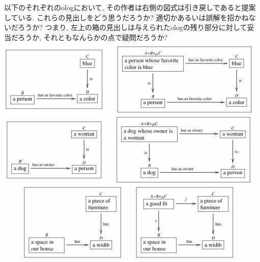 \begin{exercise}
以下のそれぞれのologにおいて, その作者は右側の図式は引き戻しであると提案している. これらの見出しをどう思うだろうか? 適切かあるいは誤解を招かねないだろうか? つまり, 左上の箱の見出しは与えられたologの残り部分に対して妥当だろうか, それともなんらかの点で疑問だろうか?
\sexc\begin{align*}\footnotesize\fbox{\xymatrix{&&\smbox{C}{blue}\LA{d}{is}\\\smbox{B}{a person}\LA{rr}{\parbox{.7in}{\rr has as favorite color}}&&\smbox{D}{a color}}}\hsp&
\footnotesize\fbox{\xymatrixnocompile{\obox{A=B\times_DC}{1.1in}{\rr a person whose favorite color is blue}\LAL{d}{is}\LA{rr}{\parbox{.7in}{\rr has as favorite color}}&&\smbox{C}{blue}\LA{d}{is}\\\smbox{B}{a person}\LA{rr}{\parbox{.7in}{\rr has as favorite color}}&&\smbox{D}{a color}}}
\end{align*}
\next\begin{align*}
\footnotesize\fbox{\xymatrixnocompile{&&\smbox{C}{a woman}\LA{d}{is}\\\smbox{B}{a dog}\LA{rr}{\parbox{.7in}{\rr has as owner}}&&\smbox{D}{a person}}}\hsp&
\footnotesize\fbox{\xymatrixnocompile{\obox{A=B\times_DC}{1in}{\rr a dog whose owner is a woman}\LAL{d}{is}\LA{rr}{\parbox{.7in}{\rr has as owner}}&&\smbox{C}{a woman}\LA{d}{is}\\\smbox{B}{a dog}\LA{rr}{\parbox{.7in}{\rr has as owner}}&&\smbox{D}{a person}}}
\end{align*}
\next\begin{align*}
\footnotesize\fbox{\xymatrixnocompile{&\obox{C}{.5in}{\rr a piece of furniture}\LA{d}{has}\\\obox{B}{.6in}{\rr a space in our house}\LA{r}{has}&\smbox{D}{a width}}}\hsp&
\footnotesize\fbox{\xymatrixnocompile{\obox{A=B\times_DC}{.5in}{\rr a good fit}\LAL{d}{$s$}\LA{r}{$f$}&\obox{C}{.5in}{\rr a piece of furniture}\LA{d}{has}\\\obox{B}{.6in}{\rr a space in our house}\LA{r}{has}&\smbox{D}{a width}}}
\end{align*}
\endsexc
\end{exercise}

